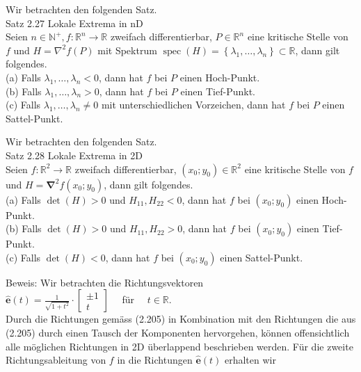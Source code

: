 \documentclass[10pt]{article}
\begin{document}
Wir betrachten den folgenden Satz.\\
Satz 2.27 Lokale Extrema in nD\\
Seien $n \in \mathbb{N}^{+}, f: \mathbb{R}^{n} \rightarrow \mathbb{R}$ zweifach differentierbar, $P \in \mathbb{R}^{n}$ eine kritische Stelle von $f$ und $H=\nabla^{2} f(P)$ mit Spektrum $\operatorname{spec}(H)=\left\{\lambda_{1}, \ldots, \lambda_{n}\right\} \subset \mathbb{R}$, dann gilt folgendes.\\
(a) Falls $\lambda_{1}, \ldots, \lambda_{n}<0$, dann hat $f$ bei $P$ einen Hoch-Punkt.\\
(b) Falls $\lambda_{1}, \ldots, \lambda_{n}>0$, dann hat $f$ bei $P$ einen Tief-Punkt.\\
(c) Falls $\lambda_{1}, \ldots, \lambda_{n} \neq 0$ mit unterschiedlichen Vorzeichen, dann hat $f$ bei $P$ einen Sattel-Punkt.

Wir betrachten den folgenden Satz.\\
Satz 2.28 Lokale Extrema in 2D\\
Seien $f: \mathbb{R}^{2} \rightarrow \mathbb{R}$ zweifach differentierbar, $\left(x_{0} ; y_{0}\right) \in \mathbb{R}^{2}$ eine kritische Stelle von $f$ und $H=\boldsymbol{\nabla}^{2} f\left(x_{0} ; y_{0}\right)$, dann gilt folgendes.\\
(a) Falls $\operatorname{det}(H)>0$ und $H_{11}, H_{22}<0$, dann hat $f$ bei $\left(x_{0} ; y_{0}\right)$ einen Hoch-Punkt.\\
(b) Falls $\operatorname{det}(H)>0$ und $H_{11}, H_{22}>0$, dann hat $f$ bei $\left(x_{0} ; y_{0}\right)$ einen Tief-Punkt.\\
(c) Falls $\operatorname{det}(H)<0$, dann hat $f$ bei $\left(x_{0} ; y_{0}\right)$ einen Sattel-Punkt.

Beweis: Wir betrachten die Richtungsvektoren\\
$\hat{\mathbf{e}}(t)=\frac{1}{\sqrt{1+t^{2}}} \cdot\left[\begin{array}{c} \pm 1 \\ t\end{array}\right] \quad$ für $\quad t \in \mathbb{R}$.\\
Durch die Richtungen gemäss (2.205) in Kombination mit den Richtungen die aus (2.205) durch einen Tausch der Komponenten hervorgehen, können offensichtlich alle möglichen Richtungen in 2D überlappend beschrieben werden. Für die zweite Richtungsableitung von $f$ in die Richtungen $\hat{\mathbf{e}}(t)$ erhalten wir
\end{document}
